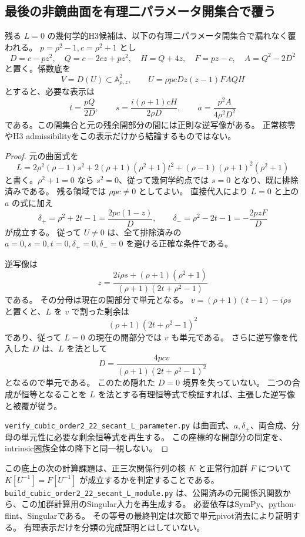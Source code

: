 \subsection{最後の非鏡曲面を有理二パラメータ開集合で覆う}
\begin{proposition}
残る $L=0$ の幾何学的H3候補は、以下の有理二パラメータ開集合で漏れなく覆われる。
$p=\rho^2-1,c=\rho^2+1$ とし
\[
 D=c-pz^2,\quad Q=c-2cz+pz^2,\quad H=Q+4z,\quad
 F=pz-c,\quad A=Q^2-2D^2
\]
と置く。係数底を
\[
 V=D(U)\subset\mathbb A^2_{\rho,z},\qquad
 U=\rho p c D z(z-1)F A Q H
\]
とすると、必要な表示は
\[
 t=\frac{pQ}{2D},\qquad
 s=\frac{i(\rho+1)cH}{2\rho D},\qquad
 a=\frac{p^2A}{4\rho^2D^2}
\]
である。この開集合と元の残余開部分の間には正則な逆写像がある。
正常核零やH3 admissibilityをこの表示だけから結論するものではない。
\end{proposition}
\begin{proof}
元の曲面式を
\[
 L=2\rho^2(\rho-1)s^2+2(\rho+1)(\rho^2+1)t^2
       +(\rho-1)(\rho+1)^2(\rho^2+1)
\]
と書く。$\rho^2+1=0$ なら $s^2=0$、従って幾何学的点では $s=0$ となり、既に排除済みである。
残る領域では $\rho p c\ne0$ としてよい。
直接代入により $L=0$ と上の $a$ の式に加え
\[
 \delta_+=\rho^2+2t-1=\frac{2pc(1-z)}D,\qquad
 \delta_-=\rho^2-2t-1=-\frac{2pzF}D
\]
が成立する。
従って $U\ne0$ は、全て排除済みの $a=0,s=0,t=0,\delta_+=0,\delta_-=0$ を避ける正確な条件である。

逆写像は
\[
 z=\frac{2i\rho s+(\rho+1)(\rho^2+1)}
         {(\rho+1)(2t+\rho^2-1)}
\]
である。
その分母は現在の開部分で単元となる。
$v=(\rho+1)(t-1)-i\rho s$ と置くと、$L$ を $v$ で割った剰余は
\[
 (\rho+1)(2t+\rho^2-1)^2
\]
であり、従って $L=0$ の現在の開部分では $v$ も単元である。
さらに逆写像を代入した $D$ は、$L$ を法として
\[
 D=\frac{4pcv}{(\rho+1)(2t+\rho^2-1)^2}
\]
となるので単元である。
このため隠れた $D=0$ 境界を失っていない。
二つの合成が恒等となることを $L$ を法とする有理恒等式で検証すれば、主張した逆写像と被覆が従う。

\texttt{verify\_cubic\_order2\_22\_secant\_L\_parameter.py}
は曲面式、$a,\delta_\pm$、両合成、分母の単元性に必要な剰余恒等式を再生する。
この座標的な開部分の同定を、intrinsic圏族全体の降下と同一視しない。
\end{proof}

この底上の次の計算課題は、正三次関係行列の核 $K$ と正常行加群 $F$ について
$K[U^{-1}]=F[U^{-1}]$ が成立するかを判定することである。
\texttt{build\_cubic\_order2\_22\_secant\_L\_module.py}
は、公開済みの元関係汎関数から、この加群計算用のSingular入力を再生成する。
必要依存はSymPy、python-flint、Singularである。
その等号の最終判定は次節で単元pivot消去により証明する。
有理表示だけを分類の完成証明とはしていない。

